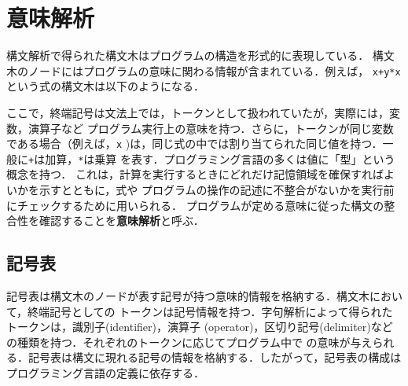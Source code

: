 \documentclass[a4j,dvipdfmx]{jbook}
\begin{document}
\chapter{意味解析}

構文解析で得られた構文木はプログラムの構造を形式的に表現している．
構文木のノードにはプログラムの意味に関わる情報が含まれている．例えば，
\verb|x+y*x|という式の構文木は以下のようになる．
\begin{center}
\end{center}

ここで，終端記号は文法上では，トークンとして扱われていたが，実際には，変数，演算子など
プログラム実行上の意味を持つ．さらに，トークンが同じ変数である場合（例えば，\texttt{x}
)は，同じ式の中では割り当てられた同じ値を持つ．一般に\texttt{+}は加算，\texttt{*}は乗算
を表す．プログラミング言語の多くは値に「型」という概念を持つ．
これは，計算を実行するときにどれだけ記憶領域を確保すればよいかを示すとともに，式や
プログラムの操作の記述に不整合がないかを実行前にチェックするために用いられる．
プログラムが定める意味に従った構文の整合性を確認することを{\bf 意味解析}と呼ぶ．

\section{記号表}

記号表は構文木のノードが表す記号が持つ意味的情報を格納する．構文木において，終端記号としての
トークンは記号情報を持つ．字句解析によって得られたトークンは，識別子(identifier)，演算子
(operator)，区切り記号(delimiter)などの種類を持つ．それぞれのトークンに応じてプログラム中で
の意味が与えられる．記号表は構文に現れる記号の情報を格納する．したがって，記号表の構成は
プログラミング言語の定義に依存する．
\end{document}
